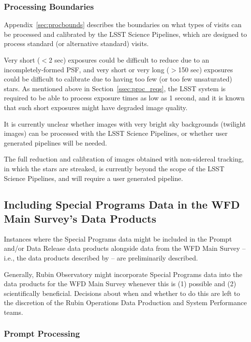 \documentclass[DM,lsstdoc,toc]{lsstdoc}
\begin{document}
\subsubsection{Processing Boundaries}

Appendix~\ref{sec:procbounds} describes the boundaries on what types of visits can be processed and calibrated by the LSST Science Pipelines, which are designed to process standard (or alternative standard) visits.

Very short ($<$2 sec) exposures could be difficult to reduce due to an incompletely-formed PSF, and very short or very long ($>$150 sec) exposures could be difficult to calibrate due to having too few (or too few unsaturated) stars.
As mentioned above in Section~\ref{ssec:proc_reqs}, the LSST system is required to be able to process exposure times as low as 1 second, and it is known that such short exposures might have degraded image quality.

It is currently unclear whether images with very bright sky backgrounds (twilight images) can be processed with the LSST Science Pipelines, or whether user generated pipelines will be needed.

The full reduction and calibration of images obtained with non-sidereal tracking, in which the stars are streaked, is currently beyond the scope of the LSST Science Pipelines, and will require a user generated pipeline.




\subsection{Including Special Programs Data in the WFD Main Survey's Data Products}\label{ssec:proc_wfd}

Instances where the Special Programs data might be included in the Prompt and/or Data Release data products alongside data from the WFD Main Survey -- i.e., the data products described by  -- are preliminarily described.

Generally, Rubin Observatory might incorporate Special Programs data into the data products for the WFD Main Survey whenever this is (1) possible and (2) scientifically beneficial.
Decisions about when and whether to do this are left to the discretion of the Rubin Operations Data Production and System Performance teams.

\subsubsection{Prompt Processing}
\end{document}
